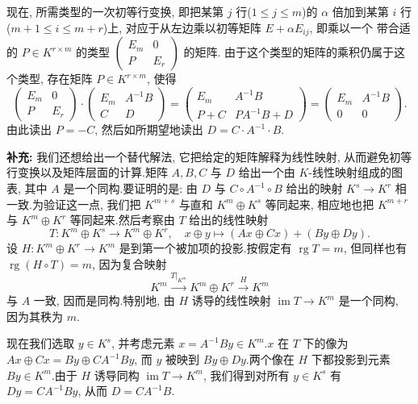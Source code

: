 现在, 所需类型的一次初等行变换, 即把某第 $j$ 行($1 \leq j \leq m$)的 $\alpha$ 倍加到某第 $i$
行($m + 1 \leq i \leq m + r$)上, 对应于从左边乘以初等矩阵 $E + \alpha E_{ij}$, 即乘以一个
带合适的 $P \in K^{r \times m}$ 的类型 $\begin{pmatrix} E_m & 0 \\ P & E_r \end{pmatrix}$ 的矩阵.
由于这个类型的矩阵的乘积仍属于这个类型, 存在矩阵 $P \in K^{r \times m}$, 使得
\[
\begin{pmatrix} E_m & 0 \\ P & E_r \end{pmatrix} \cdot \begin{pmatrix} E_m & A^{-1}B \\ C & D \end{pmatrix} = \begin{pmatrix} E_m & A^{-1}B \\ P + C & PA^{-1}B + D \end{pmatrix} = \begin{pmatrix} E_m & A^{-1}B \\ 0 & 0 \end{pmatrix}\text{.}
\]
由此读出 $P = -C$, 然后如所期望地读出 $D = C \cdot A^{-1} \cdot B$.

\noindent\textbf{补充:} 我们还想给出一个替代解法, 它把给定的矩阵解释为线性映射, 从而避免初等
行变换以及矩阵层面的计算.矩阵 $A, B, C$ 与 $D$ 给出一个由 $K$-线性映射组成的图表, 其中 $A$
是一个同构.要证明的是: 由 $D$ 与 $C \circ A^{-1} \circ B$ 给出的映射 $K^s \longrightarrow K^r$
相一致.为验证这一点, 我们把 $K^{m + s}$ 与直和 $K^m \oplus K^s$ 等同起来, 相应地也把
$K^{m + r}$ 与 $K^m \oplus K^r$ 等同起来.然后考察由 $T$ 给出的线性映射
\[
T \colon K^m \oplus K^s \longrightarrow K^m \oplus K^r, \quad x \oplus y \longmapsto (Ax \oplus Cx) + (By \oplus Dy)\text{.}
\]
设 $H \colon K^m \oplus K^r \longrightarrow K^m$ 是到第一个被加项的投影.按假定有
$\operatorname{rg} T = m$, 但同样也有 $\operatorname{rg}(H \circ T) = m$, 因为复合映射
\[
K^m \xrightarrow{T|_{K^m}} K^m \oplus K^r \xrightarrow{H} K^m
\]
与 $A$ 一致, 因而是同构.特别地, 由 $H$ 诱导的线性映射 $\operatorname{im} T \longrightarrow K^m$
是一个同构, 因为其秩为 $m$.

现在我们选取 $y \in K^s$, 并考虑元素 $x = A^{-1}By \in K^m$.$x$ 在 $T$ 下的像为
$Ax \oplus Cx = By \oplus CA^{-1}By$, 而 $y$ 被映到 $By \oplus Dy$.两个像在 $H$ 下都投影到元素
$By \in K^m$.由于 $H$ 诱导同构 $\operatorname{im} T \longrightarrow K^m$, 我们得到对所有
$y \in K^s$ 有 $Dy = CA^{-1}By$, 从而 $D = CA^{-1}B$.

